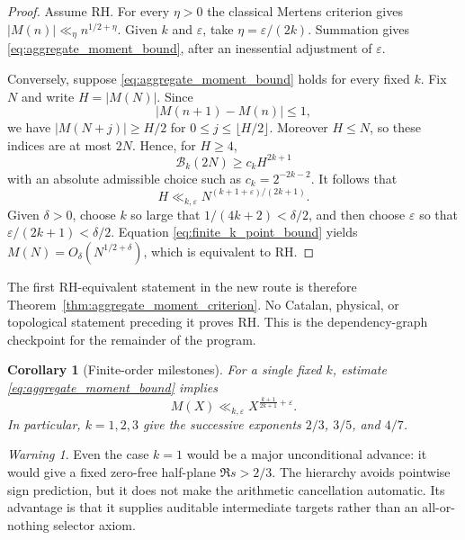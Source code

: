 \documentclass[11pt]{amsart}
\numberwithin{equation}{section}
\theoremstyle{plain}
\newtheorem{corollary}[theorem]{Corollary}
\theoremstyle{definition}
\theoremstyle{remark}
\newtheorem{warning}[theorem]{Warning}
\newcommand{\Mert}{M}
\newcommand{\eps}{\varepsilon}
\begin{document}
\begin{proof}
Assume RH.  For every $\eta>0$ the classical Mertens criterion gives
$|\Mert(n)|\ll_\eta n^{1/2+\eta}$.  Given $k$ and $\eps$, take
$\eta=\eps/(2k)$.  Summation gives
\eqref{eq:aggregate_moment_bound}, after an inessential adjustment of
$\eps$.

Conversely, suppose \eqref{eq:aggregate_moment_bound} holds for every fixed
$k$.  Fix $N$ and write $H=|\Mert(N)|$.  Since
\begin{equation}
|\Mert(n+1)-\Mert(n)|\leq1,
\label{eq:mertens_lipschitz}
\end{equation}
we have $|\Mert(N+j)|\geq H/2$ for
$0\leq j\leq\lfloor H/2\rfloor$.  Moreover $H\leq N$, so these indices are at
most $2N$.  Hence, for $H\geq4$,
\begin{equation}
\mathcal B_k(2N)
\geq
c_k H^{2k+1}
\label{eq:spike_costs_interval}
\end{equation}
with an absolute admissible choice such as $c_k=2^{-2k-2}$.  It follows that
\begin{equation}
H
\ll_{k,\eps}
N^{(k+1+\eps)/(2k+1)}.
\label{eq:finite_k_point_bound}
\end{equation}
Given $\delta>0$, choose $k$ so large that
$1/(4k+2)<\delta/2$, and then choose $\eps$ so that
$\eps/(2k+1)<\delta/2$.  Equation
\eqref{eq:finite_k_point_bound} yields
$\Mert(N)=O_\delta(N^{1/2+\delta})$, which is equivalent to RH.
\end{proof}

The first RH-equivalent statement in the new route is therefore
Theorem~\ref{thm:aggregate_moment_criterion}.  No Catalan, physical, or
topological statement preceding it proves RH.  This is the dependency-graph
checkpoint for the remainder of the program.

\begin{corollary}[Finite-order milestones]
\label{cor:finite_order_milestones}
For a single fixed $k$, estimate \eqref{eq:aggregate_moment_bound} implies
\begin{equation}
\Mert(X)
\ll_{k,\eps}
X^{\frac{k+1}{2k+1}+\eps}.
\label{eq:finite_order_exponent}
\end{equation}
In particular, $k=1,2,3$ give the successive exponents
$2/3$, $3/5$, and $4/7$.
\end{corollary}

\begin{warning}
\label{warn:finite_moment_depth}
Even the case $k=1$ would be a major unconditional advance: it would give a
fixed zero-free half-plane $\Re s>2/3$.  The hierarchy avoids pointwise sign
prediction, but it does not make the arithmetic cancellation automatic.
Its advantage is that it supplies auditable intermediate targets rather than
an all-or-nothing selector axiom.
\end{warning}
\end{document}
